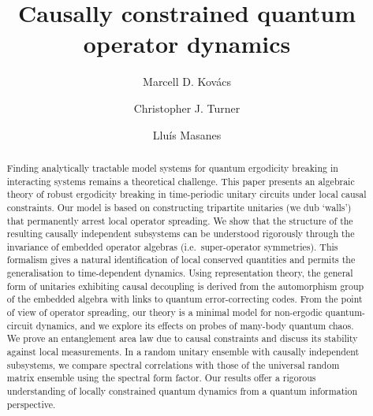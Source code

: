 \documentclass[11pt, twocolumn, floatfix, superscriptaddress, aps, prb, raggedbottom]{revtex4-2}
\newcommand\lluis[1]{\textcolor{brown}{#1}}
\begin{document}
\singlespacing
\begin{abstract}

Finding analytically tractable model systems for quantum ergodicity breaking in interacting systems remains a theoretical challenge. This paper presents an algebraic theory of robust ergodicity breaking in time-periodic unitary circuits under local causal constraints. Our model is based on constructing tripartite unitaries (we dub \enquote*{walls}) that permanently arrest local operator spreading. We show that the structure of the resulting causally independent subsystems can be understood rigorously through the invariance of embedded operator algebras (i.e.~super-operator symmetries). This formalism gives a natural identification of local conserved quantities and permits the generalisation to time-dependent dynamics. Using representation theory, the general form of unitaries exhibiting causal decoupling is derived from the automorphism group of the embedded algebra with links to quantum error-correcting codes. %
From the point of view of operator spreading, our theory is a minimal model for non-ergodic quantum-circuit dynamics, and we explore its effects on probes of many-body quantum chaos. We prove an entanglement area law due to causal constraints and discuss its stability against local measurements. In a random unitary ensemble with causally independent subsystems, we compare spectral correlations with those of the universal random matrix ensemble using the spectral form factor. Our results offer a rigorous understanding of locally constrained quantum dynamics from a quantum information perspective. %
\end{abstract}

\title{Causally constrained quantum operator dynamics}

\author{Marcell D. Kovács}
\author{Christopher J. Turner}
\author{Lluís Masanes}
\maketitle
\end{document}
